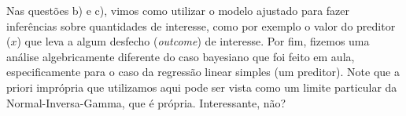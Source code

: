 {Nas questões b) e c), vimos como utilizar o modelo ajustado para fazer inferências sobre quantidades de interesse, como por exemplo o valor do preditor ($x$) que leva a algum desfecho (\textit{outcome}) de interesse.
Por fim, fizemos uma análise algebricamente diferente do caso bayesiano que foi feito em aula, especificamente para o caso da regressão linear simples (um preditor).
Note que a priori imprópria que utilizamos aqui pode ser vista como um limite particular da Normal-Inversa-Gamma, que é própria. Interessante, não?
}